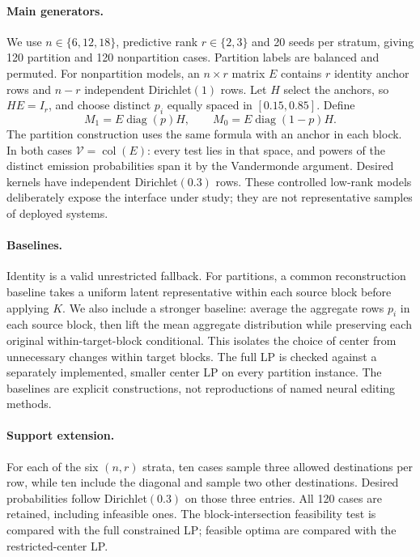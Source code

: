 \documentclass[11pt,letterpaper]{article}
\newcommand{\col}{\operatorname{col}}
\newcommand{\V}{\mathcal{V}}
\begin{document}
\paragraph{Main generators.}
We use $n\in\{6,12,18\}$, predictive rank $r\in\{2,3\}$ and 20 seeds per stratum, giving 120 partition and 120 nonpartition cases. Partition labels are balanced and permuted. For nonpartition models, an $n\times r$ matrix $E$ contains $r$ identity anchor rows and $n-r$ independent Dirichlet$(1)$ rows. Let $H$ select the anchors, so $HE=I_r$, and choose distinct $p_i$ equally spaced in $[0.15,0.85]$. Define
\begin{equation}
M_1=E\operatorname{diag}(p)H,\qquad M_0=E\operatorname{diag}(1-p)H.
\end{equation}
The partition construction uses the same formula with an anchor in each block. In both cases $\V=\col(E)$: every test lies in that space, and powers of the distinct emission probabilities span it by the Vandermonde argument. Desired kernels have independent Dirichlet$(0.3)$ rows. These controlled low-rank models deliberately expose the interface under study; they are not representative samples of deployed systems.

\paragraph{Baselines.}
Identity is a valid unrestricted fallback. For partitions, a common reconstruction baseline takes a uniform latent representative within each source block before applying $K$. We also include a stronger baseline: average the aggregate rows $p_i$ in each source block, then lift the mean aggregate distribution while preserving each original within-target-block conditional. This isolates the choice of center from unnecessary changes within target blocks. The full LP is checked against a separately implemented, smaller center LP on every partition instance. The baselines are explicit constructions, not reproductions of named neural editing methods.

\paragraph{Support extension.}
For each of the six $(n,r)$ strata, ten cases sample three allowed destinations per row, while ten include the diagonal and sample two other destinations. Desired probabilities follow Dirichlet$(0.3)$ on those three entries. All 120 cases are retained, including infeasible ones. The block-intersection feasibility test is compared with the full constrained LP; feasible optima are compared with the restricted-center LP.
\end{document}
